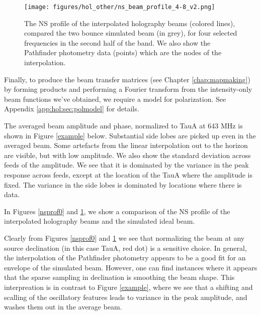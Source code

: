 \begin{figure}[h!]
\begin{center}
\texttt{[image: figures/hol\_other/ns\_beam\_profile\_4-8\_v2.png]}
\caption{The NS profile of the interpolated holography beams (colored lines), compared the two bounce simulated beam (in grey), for four selected frequencies in the second half of the band. We also show the Pathfinder photometry data (points) which are the nodes of the interpolation. \label{nsprof1}}
\end{center}
\end{figure}

Finally, to produce the beam transfer matrices (see Chapter \ref{chap:mapmaking}) by forming products and performing a Fourier transform from the intensity-only beam functions we've obtained, we require a model for polarization. See Appendix \ref{app:hol:sec:polmodel} for details.

The averaged beam amplitude and phase, normalized to TauA at 643 MHz is shown in Figure \ref{example} below. Substantial side lobes are picked up even in the averaged beam. Some artefacts from the linear interpolation out to the horizon are visible, but with low amplitude. We also show the standard deviation across feeds of the amplitude. We see that it is dominated by the variance in the peak response across feeds, except at the location of the TauA where the amplitude is fixed. The variance in the side lobes is dominated by locations where there is data.

In Figures \ref{nsprof0} and \ref{nsprof1}, we show a comparison of the NS profile of the interpolated holography beams and the simulated ideal beam.

Clearly from Figures \ref{nsprof0} and \ref{nsprof1} we see that normalizing the beam at any source declination (in this case TauA, red dot) is a sensitive choice. In general, the interpolation of the Pathfinder photometry appears to be a good fit for an envelope of the simulated beam. However, one can find instances where it appears that the sparse sampling in declination is smoothing the beam shape. This interpreation is in contrast to Figure \ref{example}, where we see that a shifting and scalling of the oscillatory features leads to variance in the peak amplitude, and washes them out in the average beam.


